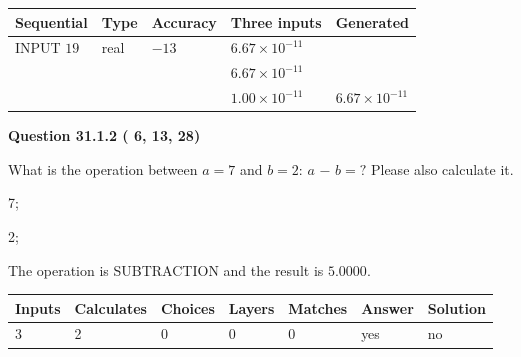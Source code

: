 \documentclass[12pt]{article}
\begin{document}
   
  
  
\noindent\begin{tabular}{|l|l|l|l|l|}
\hline
 Sequential & Type & Accuracy & Three inputs & Generated \\ 
\hline
 
 
  INPUT $          19$ & real & $         -13 $ & $
 6.67 \times 10^{-11}
  $ & \\
  & & &  $
 6.67 \times 10^{-11}
  $ & \\
  & & &  $
 1.00 \times 10^{-11}
 $ & $ 6.67 \times 10^{-11} $ 
 \\  \hline  
 \end{tabular}
   
   
  
\vspace{0.2in}
  
{\textbf{\Large{Question
31.1.2 
 (          6,         13,         28)
}}}
  
  
What is the operation between $a= %
7$ and $b= %
2$:
$a$  %
$-$ $b=?$ Please also calculate it.
 
 
\noindent{}
 
 

7;
 
2;
 
The operation is  %
SUBTRACTION and the result is
$ %
5.0000$.
 
 
 
\noindent{}
 
 

 
\vspace{0.3in}
   
   
   
   
\noindent\begin{tabular}{|l|l|l|l|l|l|l|}
 \hline
Inputs & Calculates & Choices & Layers & Matches & Answer & Solution \\ \hline
           3 & 
           2 & 
           0
  & 
           0 & 
           0 & 
  yes & 
  no 
  \\ \hline
 \end{tabular}
   
   
   
   
\noindent{}
   
   
  
\end{document}
